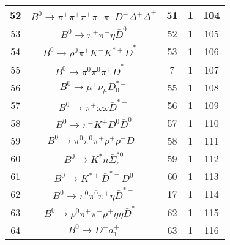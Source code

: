 \documentclass[landscape]{article}
\begin{document}
\begin{table}[htbp!]
\begin{tabular}{|c|c|c|c|c|}
\hline
52 & $ B^{0} \rightarrow \pi^{+} \pi^{+} \pi^{+} \pi^{-} \pi^{-} D^{-} \Delta^{+} \bar{\Delta}^{+} $ & 51 & 1 & 104 \\
\hline
53 & $ B^{0} \rightarrow \pi^{+} \pi^{-} \eta \bar{D}^{0} $ & 52 & 1 & 105 \\
\hline
54 & $ B^{0} \rightarrow \rho^{0} \pi^{+} K^{-} K^{*+} \bar{D}^{*-} $ & 53 & 1 & 106 \\
\hline
55 & $ B^{0} \rightarrow \pi^{0} \pi^{0} \pi^{+} \bar{D}^{*-} $ & 7 & 1 & 107 \\
\hline
56 & $ B^{0} \rightarrow \mu^{+} \nu_{\mu} D_{0}^{*-} $ & 55 & 1 & 108 \\
\hline
57 & $ B^{0} \rightarrow \pi^{+} \omega \omega \bar{D}^{*-} $ & 56 & 1 & 109 \\
\hline
58 & $ B^{0} \rightarrow \pi^{-} K^{+} D^{0} \bar{D}^{0} $ & 57 & 1 & 110 \\
\hline
59 & $ B^{0} \rightarrow \pi^{0} \pi^{0} \pi^{+} \rho^{+} \rho^{-} D^{-} $ & 58 & 1 & 111 \\
\hline
60 & $ B^{0} \rightarrow K^{*} n \bar{\Sigma}_{c}^{*0} $ & 59 & 1 & 112 \\
\hline
61 & $ B^{0} \rightarrow K^{*+} \bar{D}^{*-} D^{0} $ & 60 & 1 & 113 \\
\hline
62 & $ B^{0} \rightarrow \pi^{0} \pi^{0} \pi^{+} \eta \bar{D}^{*-} $ & 17 & 1 & 114 \\
\hline
63 & $ B^{0} \rightarrow \rho^{0} \pi^{+} \pi^{-} \rho^{+} \eta \eta \bar{D}^{*-} $ & 62 & 1 & 115 \\
\hline
64 & $ B^{0} \rightarrow D^{-} a_{1}^{+} $ & 63 & 1 & 116 \\
\hline
\end{tabular}
\end{table}

\clearpage
\end{document}
